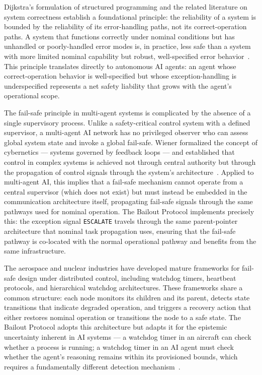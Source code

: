 Dijkstra's formulation of structured programming and the related literature on system correctness establish a foundational principle: the reliability of a system is bounded by the reliability of its error-handling paths, not its correct-operation paths. A system that functions correctly under nominal conditions but has unhandled or poorly-handled error modes is, in practice, less safe than a system with more limited nominal capability but robust, well-specified error behavior~\cite{dijkstra1982}. This principle translates directly to autonomous AI agents: an agent whose correct-operation behavior is well-specified but whose exception-handling is underspecified represents a net safety liability that grows with the agent's operational scope.

The fail-safe principle in multi-agent systems is complicated by the absence of a single supervisory process. Unlike a safety-critical control system with a defined supervisor, a multi-agent AI network has no privileged observer who can assess global system state and invoke a global fail-safe. Wiener formalized the concept of cybernetics — systems governed by feedback loops — and established that control in complex systems is achieved not through central authority but through the propagation of control signals through the system's architecture~\cite{wiener1948}. Applied to multi-agent AI, this implies that a fail-safe mechanism cannot operate from a central supervisor (which does not exist) but must instead be embedded in the communication architecture itself, propagating fail-safe signals through the same pathways used for nominal operation. The Bailout Protocol implements precisely this: the exception signal \texttt{ESCALATE} travels through the same parent-pointer architecture that nominal task propagation uses, ensuring that the fail-safe pathway is co-located with the normal operational pathway and benefits from the same infrastructure.

The aerospace and nuclear industries have developed mature frameworks for fail-safe design under distributed control, including watchdog timers, heartbeat protocols, and hierarchical watchdog architectures. These frameworks share a common structure: each node monitors its children and its parent, detects state transitions that indicate degraded operation, and triggers a recovery action that either restores nominal operation or transitions the node to a safe state. The Bailout Protocol adopts this architecture but adapts it for the epistemic uncertainty inherent in AI systems — a watchdog timer in an aircraft can check whether a process is running; a watchdog timer in an AI agent must check whether the agent's reasoning remains within its provisioned bounds, which requires a fundamentally different detection mechanism~\cite{dijkstra1982,wiener1948}.

